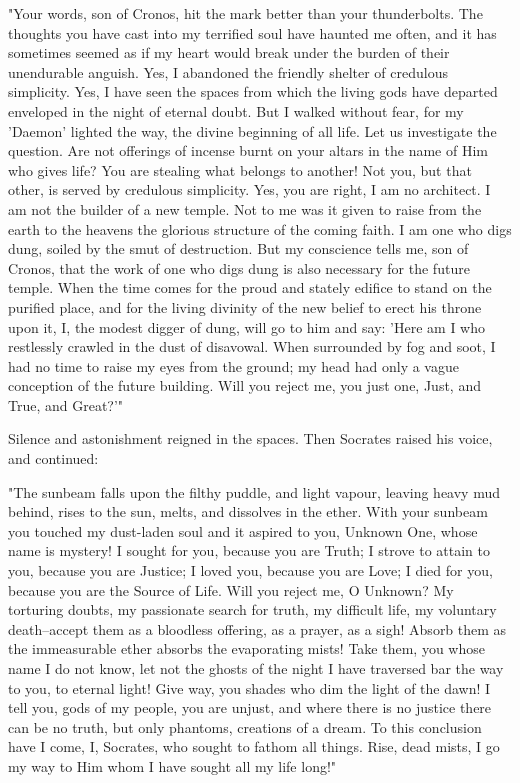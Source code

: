 "Your words, son of Cronos, hit the mark better than your
thunderbolts. The thoughts you have cast into my terrified soul have
haunted me often, and it has sometimes seemed as if my heart would
break under the burden of their unendurable anguish. Yes, I abandoned
the friendly shelter of credulous simplicity. Yes, I have seen the
spaces from which the living gods have departed enveloped in the night
of eternal doubt. But I walked without fear, for my 'Daemon' lighted
the way, the divine beginning of all life. Let us investigate the
question. Are not offerings of incense burnt on your altars in the
name of Him who gives life? You are stealing what belongs to another!
Not you, but that other, is served by credulous simplicity. Yes, you
are right, I am no architect. I am not the builder of a new temple.
Not to me was it given to raise from the earth to the heavens the
glorious structure of the coming faith. I am one who digs dung, soiled
by the smut of destruction. But my conscience tells me, son of Cronos,
that the work of one who digs dung is also necessary for the future
temple. When the time comes for the proud and stately edifice to stand
on the purified place, and for the living divinity of the new belief
to erect his throne upon it, I, the modest digger of dung, will go to
him and say: 'Here am I who restlessly crawled in the dust of
disavowal. When surrounded by fog and soot, I had no time to raise my
eyes from the ground; my head had only a vague conception of the
future building. Will you reject me, you just one, Just, and True, and
Great?'"

Silence and astonishment reigned in the spaces. Then Socrates raised
his voice, and continued:

"The sunbeam falls upon the filthy puddle, and light vapour, leaving
heavy mud behind, rises to the sun, melts, and dissolves in the ether.
With your sunbeam you touched my dust-laden soul and it aspired to
you, Unknown One, whose name is mystery! I sought for you, because you
are Truth; I strove to attain to you, because you are Justice; I loved
you, because you are Love; I died for you, because you are the Source
of Life. Will you reject me, O Unknown? My torturing doubts, my
passionate search for truth, my difficult life, my voluntary
death--accept them as a bloodless offering, as a prayer, as a sigh!
Absorb them as the immeasurable ether absorbs the evaporating mists!
Take them, you whose name I do not know, let not the ghosts of the
night I have traversed bar the way to you, to eternal light! Give way,
you shades who dim the light of the dawn! I tell you, gods of my
people, you are unjust, and where there is no justice there can be no
truth, but only phantoms, creations of a dream. To this conclusion
have I come, I, Socrates, who sought to fathom all things. Rise, dead
mists, I go my way to Him whom I have sought all my life long!"

